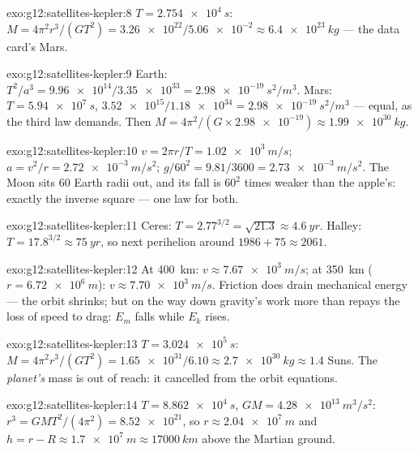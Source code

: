 \begin{solution}{exo:g12:satellites-kepler:8}
$T = \qty{2.754e4}{s}$: $M = 4\pi^2 r^3/(GT^2) =
\num{3.26e22}/\num{5.06e-2} \approx \qty{6.4e23}{kg}$ --- the data
card's Mars.
\end{solution}

\begin{solution}{exo:g12:satellites-kepler:9}
Earth: $T^2/a^3 = \num{9.96e14}/\num{3.35e33} =
\qty{2.98e-19}{s^2/m^3}$. Mars: $T = \qty{5.94e7}{s}$,
$\num{3.52e15}/\num{1.18e34} = \qty{2.98e-19}{s^2/m^3}$ --- equal, as
the third law demands. Then $M = 4\pi^2/(G \times \num{2.98e-19})
\approx \qty{1.99e30}{kg}$.
\end{solution}

\begin{solution}{exo:g12:satellites-kepler:10}
$v = 2\pi r/T = \qty{1.02e3}{m/s}$; $a = v^2/r =
\qty{2.72e-3}{m/s^2}$; $g/60^2 = 9.81/3600 = \qty{2.73e-3}{m/s^2}$.
The Moon sits $60$ Earth radii out, and its fall is $60^2$ times
weaker than the apple's: exactly the inverse square --- one law for
both.
\end{solution}

\begin{solution}{exo:g12:satellites-kepler:11}
Ceres: $T = 2.77^{3/2} = \sqrt{21.3} \approx \qty{4.6}{yr}$. Halley:
$T = 17.8^{3/2} \approx \qty{75}{yr}$, so next perihelion around
$1986 + 75 \approx 2061$.
\end{solution}

\begin{solution}{exo:g12:satellites-kepler:12}
At \qty{400}{km}: $v \approx \qty{7.67e3}{m/s}$; at \qty{350}{km}
($r = \qty{6.72e6}{m}$): $v \approx \qty{7.70e3}{m/s}$. Friction does
drain mechanical energy --- the orbit shrinks; but on the way down
gravity's work more than repays the loss of speed to drag:
$E_m$ falls while $E_k$ rises.
\end{solution}

\begin{solution}{exo:g12:satellites-kepler:13}
$T = \qty{3.024e5}{s}$: $M = 4\pi^2 r^3/(GT^2) =
\num{1.65e31}/6.10 \approx \qty{2.7e30}{kg} \approx 1.4$ Suns. The
\emph{planet's} mass is out of reach: it cancelled from the orbit
equations.
\end{solution}

\begin{solution}{exo:g12:satellites-kepler:14}
$T = \qty{8.862e4}{s}$, $GM = \qty{4.28e13}{m^3/s^2}$:
$r^3 = GMT^2/(4\pi^2) = \num{8.52e21}$, so $r \approx
\qty{2.04e7}{m}$ and $h = r - R \approx \qty{1.7e7}{m} \approx
\qty{17000}{km}$ above the Martian ground.
\end{solution}

